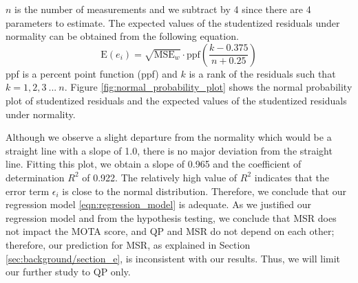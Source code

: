 $n$ is the number of measurements and we subtract by 4 since there are 4 parameters to estimate. The expected values of the studentized residuals under normality can be obtained from the following equation.
\begin{equation}
    \text{E}(e_i) = \sqrt{\text{MSE}_w} \cdot \text{ppf}( \frac{k - 0.375}{n + 0.25} )
\end{equation}
ppf is a percent point function (ppf) and $k$ is a rank of the residuals such that $k=1,2,3~...~n$. Figure \ref{fig:normal_probability_plot} shows the normal probability plot of studentized residuals and the expected values of the studentized residuals under normality.

Although we observe a slight departure from the normality which would be a straight line with a slope of 1.0, there is no major deviation from the straight line. Fitting this plot, we obtain a slope of 0.965 and the coefficient of determination $R^2$ of 0.922. The relatively high value of $R^2$ indicates that the error term $\epsilon_i$ is close to the normal distribution. Therefore, we conclude that our regression model \eqref{eqn:regression_model} is adequate. As we justified our regression model and from the hypothesis testing, we conclude that MSR does not impact the MOTA score, and QP and MSR do not depend on each other; therefore, our prediction for MSR, as explained in Section \ref{sec:background/section_e}, is inconsistent with our results. Thus, we will limit our further study to QP only.

